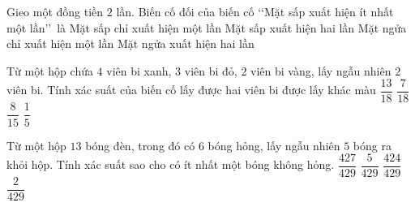 \begin{ex}%
	Gieo một đồng tiền $2$ lần. Biến cố đối của biến cố \lq\lq  Mặt sấp xuất hiện ít nhất một lần\rq\rq\, là 
	\choice
	{Mặt sấp chỉ xuất hiện một lần}
	{Mặt sấp xuất hiện hai lần}
	{Mặt ngửa chỉ xuất hiện một lần}
	{\True Mặt ngửa xuất hiện hai lần}
\end{ex}

\begin{ex}%
	Từ một hộp chứa $4$ viên bi xanh, $3$ viên bi đỏ, $2$ viên bi vàng, lấy ngẫu nhiên $2$ viên bi. Tính xác suất của biến cố lấy được hai viên bi được lấy khác màu
	\choice
	{\True $\dfrac{13}{18}$}
	{$\dfrac{7}{18}$}
	{$\dfrac{8}{15}$}
	{$\dfrac{1}{5}$}
\end{ex}

\begin{ex}%
	Từ một hộp $13$ bóng đèn, trong đó có $6$ bóng hỏng, lấy ngẫu nhiên $5$ bóng ra khỏi hộp. Tính xác suất sao cho có ít nhất một bóng không hỏng.
	\choice
	{\True $\dfrac{427}{429}$}
	{$\dfrac{5}{429}$}
	{$\dfrac{424}{429}$}
	{$\dfrac{2}{429}$}
\end{ex}

